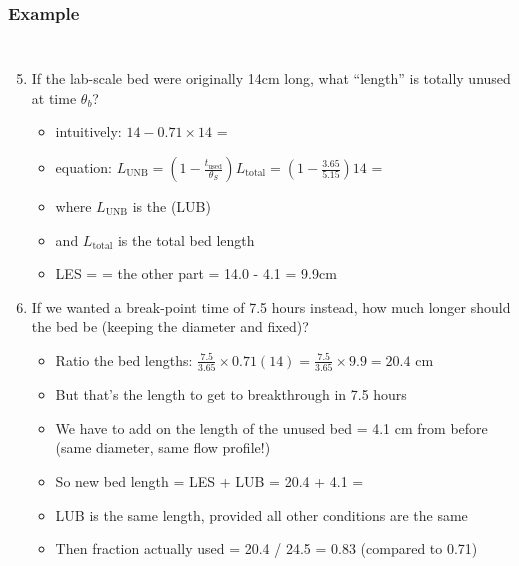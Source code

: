 \begin{frame}\frametitle{Example}
	\vspace{-12pt}
	\begin{columns}[t]
		\begin{enumerate}
			\setcounter{enumi}{4}
			\item	If the lab-scale bed were originally 14cm long, what ``length'' is totally unused at time $\theta_b$?
				\begin{itemize}
					\item	intuitively: $14 - 0.71 \times 14$ = {\color{myOrange}{4.1 cm}}
					\item	equation: $L_\text{UNB} = \left(1 - \displaystyle\frac{t_\text{used}}{\theta_S} \right)L_\text{total} = \left(1 - \displaystyle\frac{3.65}{5.15} \right)14$ = {\color{myOrange}{4.1 cm}}
					\item	where $L_\text{UNB}$ is the {\color{purple}{length of the unused bed}} (LUB)
					\item	and $L_\text{total}$ is the total bed length
					\item	LES = {\color{purple}{length of equilibrium section}} = the other part = 14.0 - 4.1 = 9.9cm
				\end{itemize}
			\vspace{6pt}
			\pause
			\item	If we wanted a break-point time of 7.5 hours instead, how much longer should the bed be {\small (keeping the diameter and {\color{purple}{flow profile}} fixed)}?
			\begin{itemize}
				\item	Ratio the bed lengths: $\displaystyle \frac{7.5}{3.65} \times 0.71(14) = \frac{7.5}{3.65} \times 9.9 = 20.4$ cm
				\item	But that's the length to get to breakthrough in 7.5 hours
				\item	We have to add on the length of the unused bed = 4.1 cm from before (same diameter, same flow profile!)
				\item	So new bed length = LES + LUB = 20.4 + 4.1  = {\color{myOrange}{24.5 cm}}
				\item	LUB is the same length, provided all other conditions are the same
				\item	Then fraction actually used = 20.4 / 24.5 = 0.83 {\scriptsize (compared to 0.71)}
			\end{itemize}
		\end{enumerate}
	\end{columns}
\end{frame}

